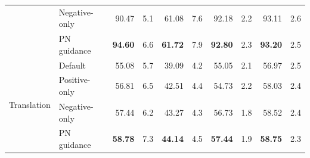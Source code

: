 \begin{table}[t!]
\begin{tabular}{ll *{8}{r}}
 & {Negative-only} & {90.47} & {5.1} & {61.08} & {7.6} & {92.18} & {2.2} & {93.11} & {2.6} \\
 & PN guidance & \textbf{94.60} & 6.6 & \textbf{61.72} & 7.9 & \textbf{92.80} & 2.3 & \textbf{93.20} & 2.5 \\
\midrule
\multirow{4}{*}{Translation}
 & Default & 55.08 & 5.7 & 39.09 & 4.2 & 55.05 & 2.1 & 56.97 & 2.5 \\
 & {Positive-only} & {56.81} & {6.5} & {42.51} & {4.4} & {54.73} & {2.2} & {58.03} & {2.4} \\
 & {Negative-only} & {57.44} & {6.2} & {43.27} & {4.3} & {56.73} & {1.8} & {58.52} & {2.4} \\
 & PN guidance & \textbf{58.78} & 7.3 & \textbf{44.14} & 4.5 & \textbf{57.44} & 1.9 & \textbf{58.75} & 2.3 \\
\bottomrule
\end{tabular}
\end{table}
